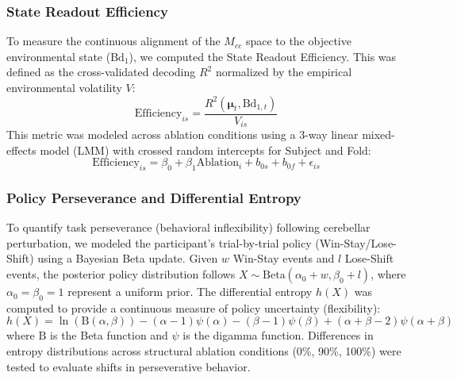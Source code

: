 \documentclass[12pt, a4paper]{extarticle}
\begin{document}
\subsubsection{State Readout Efficiency}
To measure the continuous alignment of the $M_{cc}$ space to the objective environmental state ($\mathrm{Bd}_1$), we computed the State Readout Efficiency. This was defined as the cross-validated decoding $R^2$ normalized by the empirical environmental volatility $V$:
\begin{equation}
	\text{Efficiency}_{is} = \frac{R^2(\boldsymbol{\mu}_t, \mathrm{Bd}_{1, t})}{V_{is}}
\end{equation}
This metric was modeled across ablation conditions using a 3-way linear mixed-effects model (LMM) with crossed random intercepts for Subject and Fold:
\begin{equation}
	\text{Efficiency}_{is} = \beta_0 + \beta_1 \mathrm{Ablation}_i + b_{0s} + b_{0f} + \epsilon_{is}
\end{equation}

\subsubsection{Policy Perseverance and Differential Entropy}
To quantify task perseverance (behavioral inflexibility) following cerebellar perturbation, we modeled the participant's trial-by-trial policy (Win-Stay/Lose-Shift) using a Bayesian Beta update. Given $w$ Win-Stay events and $l$ Lose-Shift events, the posterior policy distribution follows $X \sim \text{Beta}(\alpha_0 + w, \beta_0 + l)$, where $\alpha_0=\beta_0=1$ represent a uniform prior. The differential entropy $h(X)$ was computed to provide a continuous measure of policy uncertainty (flexibility):
\begin{equation}
	h(X) = \ln(\mathrm{B}(\alpha, \beta)) - (\alpha - 1)\psi(\alpha) - (\beta - 1)\psi(\beta) + (\alpha + \beta - 2)\psi(\alpha + \beta)
\end{equation}
where $\mathrm{B}$ is the Beta function and $\psi$ is the digamma function. Differences in entropy distributions across structural ablation conditions (0\%, 90\%, 100\%) were tested to evaluate shifts in perseverative behavior.
\end{document}
